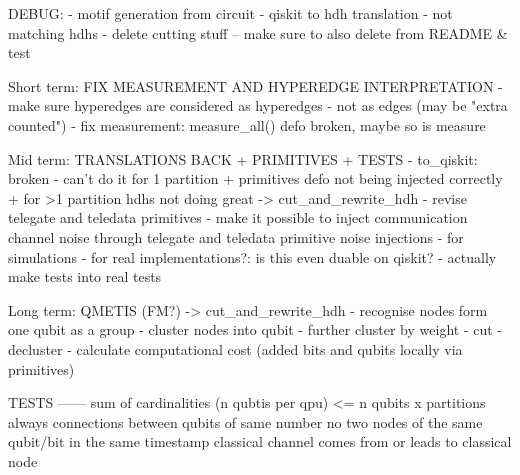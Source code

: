 DEBUG: 
- motif generation from circuit
- qiskit to hdh translation - not matching hdhs
- delete cutting stuff -- make sure to also delete from README & test

Short term: FIX MEASUREMENT AND HYPEREDGE INTERPRETATION
- make sure hyperedges are considered as hyperedges - not as edges (may be "extra counted")
- fix measurement: measure_all() defo broken, maybe so is measure

Mid term: TRANSLATIONS BACK + PRIMITIVES + TESTS 
- to_qiskit: broken - can't do it for 1 partition + primitives defo not being injected correctly + for >1 partition hdhs not doing great
    -> cut_and_rewrite_hdh
- revise telegate and teledata primitives
- make it possible to inject communication channel noise through telegate and teledata primitive noise injections 
    - for simulations
    - for real implementations?: is this even duable on qiskit?
- actually make tests into real tests

Long term: QMETIS (FM?)     -> cut_and_rewrite_hdh
- recognise nodes form one qubit as a group
- cluster nodes into qubit
- further cluster by weight
- cut
- decluster
- calculate computational cost (added bits and qubits locally via primitives)

TESTS
------ 
sum of cardinalities (n qubtis per qpu) <= n qubits x partitions
always connections between qubits of same number
no two nodes of the same qubit/bit in the same timestamp
classical channel comes from or leads to classical node